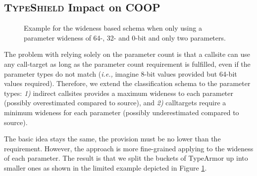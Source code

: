 \subsection{\textsc{TypeShield} Impact on COOP}
\label{TypeShild Impact on COOP}
\begin{figure}[h!]
\centering
{}
\caption{Example for the wideness based schema when only using a parameter wideness of 64-, 32- and 0-bit and only two parameters.}
\label{fig:lattice3264}
\end{figure}
The problem with relying solely on the parameter count is that a callsite can use any call-target as long as the parameter count 
requirement is fulfilled, even if the parameter types do not match (\textit{i.e.,} imagine 8-bit values provided but 64-bit values required). 
Therefore, we extend the classification schema to the parameter types:
\textit{1)} indirect callsites provides a maximum wideness to each parameter (possibly overestimated compared to source), and 
\textit{2)} calltargets require a minimum wideness for each parameter (possibly underestimated compared to source).

The basic idea stays the same, the provision must be no lower than the requirement. However, the approach is more fine-grained 
applying to the wideness of each parameter. The result is that we split the buckets of TypeArmor up into smaller ones as shown 
in the limited example depicted in Figure \ref{fig:lattice3264}.
